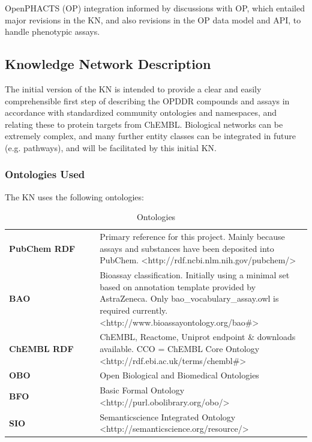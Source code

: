 OpenPHACTS (OP) integration informed by discussions with OP, which entailed major revisions in the KN, and also revisions in the OP data model and API, to handle phenotypic assays. 

\subsection{Knowledge Network Description}

The initial version of the KN is intended to provide a clear and easily comprehensible first step of describing the OPDDR compounds and assays in accordance with standardized community ontologies and namespaces, and relating these to protein targets from ChEMBL.  Biological networks can be extremely complex, and many further entity classes can be integrated in future (e.g. pathways), and will be facilitated by this initial KN.

\subsubsection{Ontologies Used}

The KN uses the following ontologies:

\begin{table}[]
\caption{Ontologies}
\label{tab:opddr_01}
\centering
\begin{tabular}{p{0.3\linewidth}p{0.7\linewidth}}
\hline
\textbf{PubChem RDF} & Primary reference for this project.  Mainly because assays and substances have been deposited into PubChem. 
\textless http://rdf.ncbi.nlm.nih.gov/pubchem/\textgreater \\
\textbf{BAO} & Bioassay classification.  Initially using a minimal set based on annotation template provided by AstraZeneca.  Only bao\_vocabulary\_assay.owl is required currently.
\textless http://www.bioassayontology.org/bao\#\textgreater \\
\textbf{ChEMBL RDF} & ChEMBL, Reactome, Uniprot endpoint \& downloads available.
CCO = ChEMBL Core Ontology
\textless http://rdf.ebi.ac.uk/terms/chembl\#\textgreater \\
\textbf{OBO} & Open Biological and Biomedical Ontologies \\
\textbf{BFO} &  Basic Formal Ontology \textless http://purl.obolibrary.org/obo/\textgreater \\
\textbf{SIO} & Semanticscience Integrated Ontology
\textless http://semanticscience.org/resource/\textgreater \\
\end{tabular}
\end{table}


